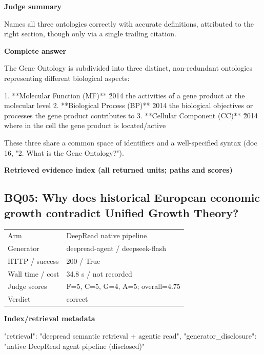 \documentclass[10pt]{article}
\begin{document}
\textbf{Judge summary}
\begin{EvidenceText}
Names all three ontologies correctly with accurate definitions, attributed to the right section, though only via a single trailing citation.
\end{EvidenceText}

\textbf{Complete answer}
\begin{AnswerText}
The Gene Ontology is subdivided into three distinct, non-redundant ontologies representing different biological aspects:

1. **Molecular Function (MF)** \u2014 the activities of a gene product at the molecular level
2. **Biological Process (BP)** \u2014 the biological objectives or processes the gene product contributes to
3. **Cellular Component (CC)** \u2014 where in the cell the gene product is located/active

These three share a common space of identifiers and a well-specified syntax (doc 16, "2. What is the Gene Ontology?").
\end{AnswerText}

\textbf{Retrieved evidence index (all returned units; paths and scores) }
\begin{EvidenceText}
\end{EvidenceText}
\subsection{BQ05: Why does historical European economic growth contradict Unified Growth Theory?}
\begin{tabular}{@{}ll@{}}
Arm & DeepRead native pipeline\\
Generator & deepread-agent / deepseek-flash\\
HTTP / success & 200 / True\\
Wall time / cost & 34.8 s / not recorded\\
Judge scores & F=5, C=5, G=4, A=5; overall=4.75\\
Verdict & correct\\
\end{tabular}

\textbf{Index/retrieval metadata}
\begin{EvidenceText}
{
  "retrieval": "deepread semantic retrieval + agentic read",
  "generator_disclosure": "native DeepRead agent pipeline (disclosed)"
}
\end{EvidenceText}
\end{document}
